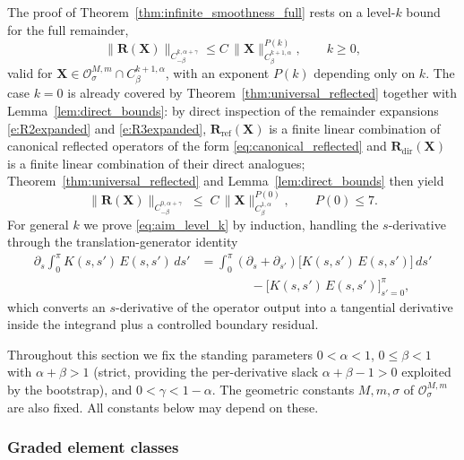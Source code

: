 \documentclass{amsart}
\begin{document}
The proof of Theorem~\ref{thm:infinite_smoothness_full} rests on a level-$k$ bound for the full remainder,
\begin{equation}\label{eq:aim_level_k}
\|\mathbf{R}(\mathbf{X})\|_{C^{k,\alpha+\gamma}_{-\beta}}
\le C\, \|\mathbf{X}\|_{C^{k+1,\alpha}_\beta}^{P(k)},
\qquad k \ge 0,
\end{equation}
valid for $\mathbf{X} \in \mathcal{O}^{M,m}_\sigma \cap C^{k+1,\alpha}_\beta$, with an exponent $P(k)$ depending only on $k$.  The case $k = 0$ is already covered by Theorem~\ref{thm:universal_reflected} together with Lemma~\ref{lem:direct_bounds}:  by direct inspection of the remainder expansions \eqref{e:R2expanded} and \eqref{e:R3expanded}, $\mathbf{R}_{\mathrm{ref}}(\mathbf{X})$ is a finite linear combination of canonical reflected operators of the form \eqref{eq:canonical_reflected} and $\mathbf{R}_{\mathrm{dir}}(\mathbf{X})$ is a finite linear combination of their direct analogues; Theorem~\ref{thm:universal_reflected} and Lemma~\ref{lem:direct_bounds} then yield
\[
\|\mathbf{R}(\mathbf{X})\|_{C^{0,\alpha+\gamma}_{-\beta}}
\;\le\; C\,\|\mathbf{X}\|_{C^{1,\alpha}_\beta}^{P(0)}, 
\qquad P(0) \le 7 .
\]
For general $k$ we prove \eqref{eq:aim_level_k} by induction, handling the $s$-derivative through the translation-generator identity
\begin{equation}
\begin{split}
\label{eq:translation_generator}
\partial_s \int_0^\pi K(s,s')\, E(s,s')\, ds'
& =
\int_0^\pi (\partial_s + \partial_{s'})\!\bigl[K(s,s')\, E(s,s')\bigr]\, ds' \\
& \qquad \qquad  -\bigl[K(s,s')\, E(s,s')\bigr]_{s'=0}^{\pi},
\end{split}
\end{equation}
which converts an $s$-derivative of the operator output into a tangential derivative inside the integrand plus a controlled boundary residual.

Throughout this section we fix the standing parameters $0 < \alpha < 1$, $0 \le \beta < 1$ with $\alpha + \beta > 1$ (strict, providing the per-derivative slack $\alpha+\beta-1>0$ exploited by the bootstrap), and $0 < \gamma < 1 - \alpha$.  The geometric constants $M, m, \sigma$ of $\mathcal{O}^{M,m}_\sigma$ are also fixed.  All constants below may depend on these.

\subsubsection{Graded element classes}
\end{document}

